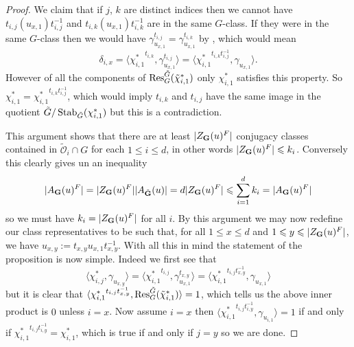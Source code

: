 \documentclass{jt-calcs}
\renewcommand{\cref}{\Cref}
\begin{document}
\begin{proof}
We claim that if $j$, $k$ are distinct indices then we cannot have $t_{i,j}(u_{x,1})t_{i,j}^{-1}$ and $t_{i,k}(u_{x,1})t_{i,k}^{-1}$ are in the same $G$-class. If they were in the same $G$-class then we would have $\gamma_{u_{x,1}}^{t_{i,j}} = \gamma_{u_{x,1}}^{t_{i,k}}$ by \cref{prop:gggr-conj}, which would mean
\begin{equation*}
\delta_{i,x} = \langle {\chi_{i,1}^*}^{t_{i,k}}, \gamma_{u_{x,1}}^{t_{i,j}} \rangle = \langle {\chi_{i,1}^*}^{t_{i,k}t_{i,j}^{-1}}, \gamma_{u_{x,1}} \rangle.
\end{equation*}
However of all the components of $\operatorname{Res}^{\tilde{G}}_G(\tilde{\chi}_{i,1}^*)$ only $\chi_{i,1}^*$ satisfies this property. So $\chi_{i,1}^* = {\chi_{i,1}^*}^{t_{i,k}t_{i,j}^{-1}}$, which would imply $t_{i,k}$ and $t_{i,j}$ have the same image in the quotient $\tilde{G}/\operatorname{Stab}_{\tilde{G}}(\chi_{i,1}^*)$ but this is a contradiction.

This argument shows that there are at least $|Z_{\mathbf{G}}(u)^F|$ conjugacy classes contained in $\mathcal{\tilde{O}}_i \cap G$ for each $1 \leqslant i \leqslant d$, in other words $|Z_{\mathbf{G}}(u)^F| \leqslant k_i$. Conversely this clearly gives un an inequality
\begin{equation*}
|A_{\mathbf{G}}(u)^F| = |Z_{\mathbf{G}}(u)^F||A_{\tilde{\mathbf{G}}}(u)| = d|Z_{\mathbf{G}}(u)^F| \leqslant \sum_{i=1}^{d} k_i = |A_{\mathbf{G}}(u)^F|
\end{equation*}
so we must have $k_i = |Z_{\mathbf{G}}(u)^F|$ for all $i$. By this argument we may now redefine our class representatives to be such that, for all $1 \leqslant x \leqslant d$ and $1 \leqslant y \leqslant |Z_{\mathbf{G}}(u)^F|$, we have $u_{x,y} := t_{x,y}u_{x,1}t_{x,y}^{-1}$. With all this in mind the statement of the proposition is now simple. Indeed we first see that
\begin{equation*}
\langle \chi_{i,j}^*, \gamma_{u_{x,y}} \rangle = \langle {\chi_{i,1}^*}^{t_{i,j}}, \gamma_{u_{x,1}}^{t_{x,y}} \rangle = \langle {\chi_{i,1}^*}^{t_{i,j}t_{x,y}^{-1}}, \gamma_{u_{x,1}} \rangle
\end{equation*}
but it is clear that $\langle {\chi_{i,1}^*}^{t_{i,j}t_{x,y}^{-1}}, \operatorname{Res}_G^{\tilde{G}}(\tilde{\chi}_{i,1}^*) \rangle = 1$, which tells us the above inner product is $0$ unless $i=x$. Now assume $i = x$ then $\langle {\chi_{i,1}^*}^{t_{i,j}t_{i,y}^{-1}}, \gamma_{u_{i,1}} \rangle  = 1$ if and only if ${\chi_{i,1}^*}^{t_{i,j}t_{i,y}^{-1}} = \chi_{i,1}^*$, which is true if and only if $j = y$ so we are done.
\end{proof}
\end{document}
